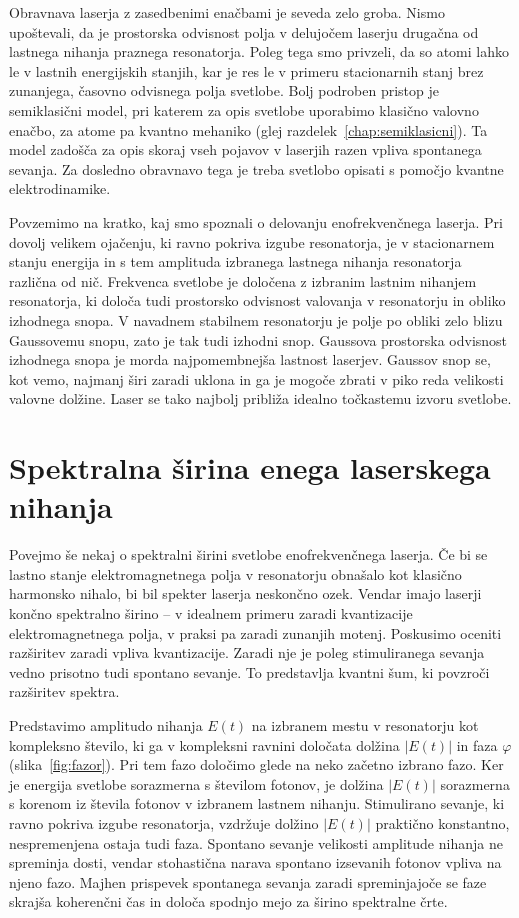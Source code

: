 \begin{remark}
Obravnava laserja z zasedbenimi enačbami je seveda zelo groba. Nismo
upoštevali, da je prostorska odvisnost polja v delujočem laserju 
drugačna od lastnega nihanja praznega resonatorja. Poleg tega smo
privzeli, da so atomi lahko le v lastnih energijskih stanjih, kar je res le
v primeru stacionarnih stanj brez zunanjega, časovno odvisnega polja
svetlobe. Bolj podroben pristop je semiklasični model, pri katerem 
za opis svetlobe uporabimo klasično valovno enačbo, za atome
pa kvantno mehaniko (glej razdelek~\ref{chap:semiklasicni}). Ta model
zadošča za opis skoraj vseh pojavov v laserjih razen vpliva spontanega sevanja. 
Za dosledno obravnavo tega je treba svetlobo opisati s pomočjo 
kvantne elektrodinamike.
\end{remark}

Povzemimo na kratko, kaj smo spoznali o delovanju 
enofrekvenčnega laserja. Pri dovolj velikem ojačenju, ki ravno pokriva izgube 
resonatorja, je v stacionarnem stanju energija in s tem amplituda 
izbranega lastnega nihanja resonatorja različna od nič. Frekvenca svetlobe je
določena z izbranim lastnim nihanjem resonatorja, ki določa tudi prostorsko
odvisnost valovanja v resonatorju in obliko izhodnega snopa. V navadnem stabilnem 
resonatorju je polje po obliki zelo blizu Gaussovemu snopu, zato je tak tudi izhodni snop.
Gaussova prostorska odvisnost izhodnega snopa je morda najpomembnejša lastnost
laserjev. Gaussov snop se, kot vemo, najmanj širi zaradi uklona in ga je mogoče
zbrati v piko reda velikosti valovne dolžine. Laser se tako najbolj 
približa idealno točkastemu izvoru svetlobe.

\section{Spektralna širina enega laserskega nihanja}
Povejmo še nekaj o spektralni širini svetlobe enofrekvenčnega laserja. 
Če bi se lastno stanje 
elektromagnetnega polja v resonatorju obnašalo kot klasično 
harmonsko nihalo, bi bil spekter laserja neskončno ozek. Vendar 
imajo laserji končno spektralno širino -- v idealnem primeru zaradi
kvantizacije elektromagnetnega polja, v praksi pa zaradi zunanjih motenj.
Poskusimo oceniti razširitev zaradi vpliva kvantizacije. Zaradi nje
je poleg stimuliranega sevanja vedno prisotno tudi spontano sevanje. To 
predstavlja kvantni šum, ki povzroči razširitev spektra. 

Predstavimo amplitudo nihanja $E(t)$ na izbranem mestu v resonatorju kot kompleksno 
število, ki ga v kompleksni ravnini določata dolžina $|E(t)|$ in faza
$\varphi$ (slika~\ref{fig:fazor}). 
Pri tem fazo določimo glede na neko začetno izbrano fazo. 
Ker je energija svetlobe sorazmerna s številom fotonov, je dolžina $|E(t)|$
sorazmerna s korenom iz števila fotonov v izbranem lastnem nihanju. 
Stimulirano sevanje, ki ravno pokriva izgube resonatorja, vzdržuje
dolžino $|E(t)|$ praktično konstantno, nespremenjena ostaja 
tudi faza. Spontano sevanje velikosti amplitude nihanja ne spreminja dosti, 
vendar stohastična narava spontano izsevanih fotonov vpliva na njeno fazo.
Majhen prispevek spontanega sevanja zaradi spreminjajoče se faze
skrajša koherenčni čas in določa spodnjo mejo za širino spektralne črte. 

